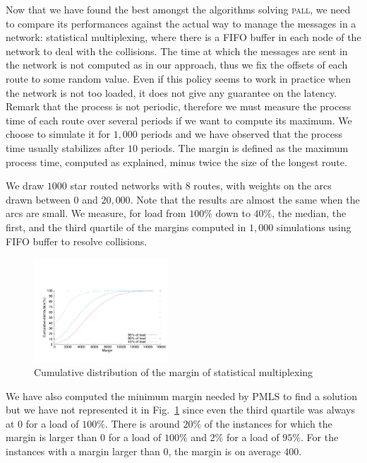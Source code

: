 \documentclass[10pt, conference, letterpaper]{IEEEtran}
\newcommand\pall{\textsc{pall}\xspace}
\begin{document}
     
     
     Now that we have found the best amongst the algorithms solving \pall, we need to compare its performances against the actual way to manage the messages in a network:  statistical multiplexing, where there is a FIFO buffer in each node of the network to deal with the collisions. The time at which the messages are sent in the network is not computed as in our approach, thus we fix the offsets of each route to some random value.
     Even if this policy seems to work in practice when the network is not too loaded, it does not give any guarantee on the latency. Remark that the process is not periodic, therefore we must measure the process time of each route over several periods if we want to compute its maximum. We choose to simulate it for $1,000$ periods and we have observed that the process time usually stabilizes after $10$ periods. The margin is defined as the maximum process time, computed as explained, minus twice the size of the longest route. 
	    
     
     We draw $1000$ star routed networks with $8$ routes, with weights on the arcs drawn between $0$ and $20,000$. Note that the results are almost the same when the arcs are small. We measure, for load from $100\%$ down to $40\%$, the median, the first, and the third quartile of the margins computed in $1,000$ simulations using FIFO buffer to resolve collisions.

      
    \begin{figure}
       \begin{center}
      \includegraphics[width = 0.45\textwidth]{stochastic.pdf}
      \end{center}
      \caption{Cumulative distribution of the margin of statistical multiplexing}
      \label{fig:sto}
      \vspace{-0.5cm}
     \end{figure}    
     
     We have also computed the minimum margin needed by PMLS to find a solution but we have not represented it in Fig.~\ref{fig:sto} since even the third quartile was always at $0$ for a load of $100\%$. There is around $20\%$ of the instances for which the margin is larger than $0$ for a load of $100\%$ and $2\%$ for a load of $95\%$. For the instances with a margin larger than $0$, the margin is on average $400$.
     
\end{document}
